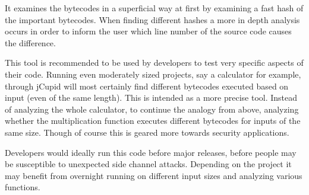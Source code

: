 \documentclass[letterpaper,twocolumn,10pt]{article}
\begin{document}
It examines the bytecodes in a superficial way at first by examining a fast hash of the important bytecodes. When finding different hashes a more in depth analysis occurs in order to inform the user which line number of the source code causes the difference. 

This tool is recommended to be used by developers to test very specific aspects of their code. Running even moderately sized projects, say a calculator for example, through jCupid will most certainly find different bytecodes executed based on input (even of the same length). This is intended as a more precise tool. Instead of analyzing the whole calculator, to continue the analogy from above, analyzing whether the multiplication function executes different bytecodes for inputs of the same size. Though of course this is geared more towards security applications.

Developers would ideally run this code before major releases, before people may be susceptible to unexpected side channel attacks. Depending on the project it may benefit from overnight running on different input sizes and analyzing various functions.


{\footnotesize 
}
\end{document}
